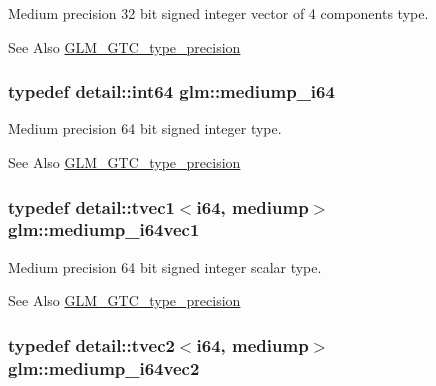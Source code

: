 Medium precision 32 bit signed integer vector of 4 components type. \begin{DoxySeeAlso}{See Also}
\hyperlink{group__gtc__type__precision}{G\-L\-M\-\_\-\-G\-T\-C\-\_\-type\-\_\-precision} 
\end{DoxySeeAlso}
\hypertarget{group__gtc__type__precision_ga90fedf6c701ffbe00535156715e50787}{
\subsubsection[{mediump\-\_\-i64}]{\setlength{\rightskip}{0pt plus 5cm}typedef detail\-::int64 {\bf glm\-::mediump\-\_\-i64}}}\label{group__gtc__type__precision_ga90fedf6c701ffbe00535156715e50787}
Medium precision 64 bit signed integer type. \begin{DoxySeeAlso}{See Also}
\hyperlink{group__gtc__type__precision}{G\-L\-M\-\_\-\-G\-T\-C\-\_\-type\-\_\-precision} 
\end{DoxySeeAlso}
\hypertarget{group__gtc__type__precision_gad2423a91c791b9ca2f8a3ecfc71b080d}{
\subsubsection[{mediump\-\_\-i64vec1}]{\setlength{\rightskip}{0pt plus 5cm}typedef detail\-::tvec1$<$i64, mediump$>$ {\bf glm\-::mediump\-\_\-i64vec1}}}\label{group__gtc__type__precision_gad2423a91c791b9ca2f8a3ecfc71b080d}
Medium precision 64 bit signed integer scalar type. \begin{DoxySeeAlso}{See Also}
\hyperlink{group__gtc__type__precision}{G\-L\-M\-\_\-\-G\-T\-C\-\_\-type\-\_\-precision} 
\end{DoxySeeAlso}
\hypertarget{group__gtc__type__precision_ga5cf0bec13b01b6124e966360cffe15a4}{
\subsubsection[{mediump\-\_\-i64vec2}]{\setlength{\rightskip}{0pt plus 5cm}typedef detail\-::tvec2$<$i64, mediump$>$ {\bf glm\-::mediump\-\_\-i64vec2}}}\label{group__gtc__type__precision_ga5cf0bec13b01b6124e966360cffe15a4}
